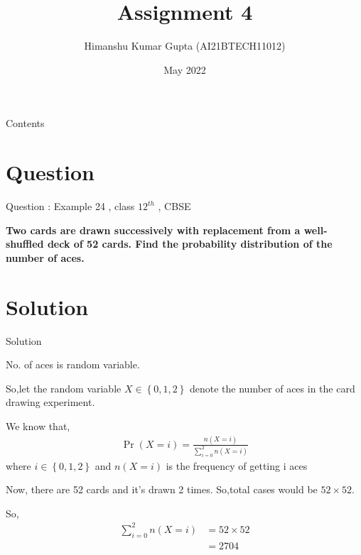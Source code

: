 \documentclass{beamer}
\title{Assignment 4}
\author{Himanshu Kumar Gupta (AI21BTECH11012)}
\date {May 2022}
\providecommand{\brak}[1]{\ensuremath{\left(#1\right)}}
\providecommand{\cbrak}[1]{\ensuremath{\left\{#1\right\}}}
\begin{document}
\begin{frame}
    \titlepage 
\end{frame}

\begin{frame}{Contents}
    \tableofcontents
\end{frame}

\section{Question}
\begin{frame}{Question : Example 24 , class $12^{th}$ , CBSE}

\textbf{Two cards are drawn successively with replacement from a well-shuffled
deck of 52 cards. Find the probability distribution of the number of aces.}
\end{frame}

\section{Solution}
\begin{frame}{Solution}


No. of aces is random variable.

So,let the random variable $X\in{\cbrak{0,1,2}}$ denote
the number of aces in the card drawing experiment.

We know that,
\begin{align}
\label{eq:1}
\Pr\brak{X = i} = \frac{n\brak{X = i}}{\sum_{i=0}^2 n\brak{X = i}}
\end{align}
where $i\in\cbrak{{0,1,2}}$ and $n\brak{X = i}$ is the frequency of getting i aces
\end{frame}
\begin{frame}
Now, there are 52 cards and it's drawn 2 times. So,total cases would be $52\times52$.

So,
\begin{align}
\label{eq:2}
\sum_{i=0}^2 n\brak{X = i}&=52\times52 \nonumber \\
&=2704
\end{align}
\end{frame}
\end{document}
